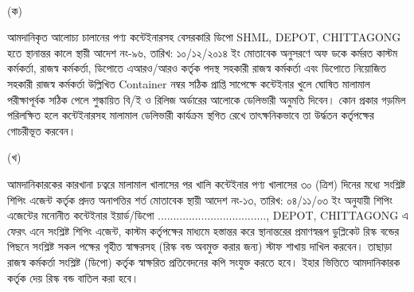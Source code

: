 \documentclass[12pt]{article}
\newcommand{\depo}{SHML, DEPOT, CHITTAGONG}
\newcommand{\rdepo}{..................................., DEPOT, CHITTAGONG}
\begin{document}
\\
\begin{minipage}[t]{0.04\linewidth}
\hspace{0.5em}
\end{minipage}
\begin{minipage}[t]{0.04\linewidth}
\scriptsize{(ক)}
\end{minipage}
\begin{minipage}[t]{.92\linewidth}
\scriptsize{আমদানিকৃত আলোচ্য চালানের পণ্য
কন্টেইনারসহ বেসরকারি ডিপো
{\depo}
হতে স্থানান্তর কালে স্থায়ী
আদেশ নং-৯৬, তারিখ: ১০/১২/২০১৪ ইং
মোতাবেক অনুসরণে অফ ডকে
কর্মরত কাস্টম কর্মকর্তা, রাজস্ব কর্মকর্তা,
ডিপোতে এআরও/আরও কর্তৃক পদস্থ সহকারী রাজস্ব
কর্মকর্তা এবং ডিপোতে নিয়োজিত সহকারী
রাজস্ব কর্মকর্তা উল্লিখিত Container
নম্বর সঠিক প্রাপ্তি সাপেক্ষে কন্টেইনার খুলে
ঘোষিত মালামাল পরীক্ষাপূর্বক সঠিক পেলে শুল্কায়িত
বি/ই ও রিলিজ অর্ডারের আলোকে ডেলিভারী অনুমতি
দিবেন। কোন প্রকার গড়মিল পরিলক্ষিত হলে
কন্টেইনারসহ মালামাল ডেলিভারী কার্যক্রম স্থগিত রেখে
তাৎক্ষনিকভাবে তা উর্দ্ধতন কর্তৃপক্ষের গোচরীভূত করবেন।}
\\
\end{minipage}
\begin{minipage}[t]{0.04\linewidth}
\hspace{0.5em}
\end{minipage}
\begin{minipage}[t]{0.04\linewidth}
\scriptsize{(খ)}
\end{minipage}
\begin{minipage}[t]{0.92\linewidth}
\scriptsize{আমদানিকারকের কারখানা চত্বরে
মালামাল খালাসের পর খালি কন্টেইনার পণ্য খালাসের
৩০ (ত্রিশ) দিনের মধ্যে সংশ্লিষ্ট শিপিং এজেন্ট কর্তৃক
প্রদত্ত অনাপত্তির শর্ত মোতাবেক স্থায়ী
আদেশ নং-১৩, তারিখ: ০৪/১১/০৩ ইং
অনুযায়ী শিপিং এজেন্টের মনোনীত কন্টেইনার
ইয়ার্ড/ডিপো {\rdepo} এ ফেরৎ এনে সংশ্লিষ্ট
শিপিং এজেন্ট, কাস্টম কর্তৃপক্ষের মাধ্যমে হস্তান্তর করে
স্থানান্তরের প্রমাণস্বরূপ ডুপ্লিকেট রিস্ক বন্ডের পিছনে
সংশ্লিষ্ট সকল পক্ষের গৃহীত স্বাক্ষরসহ
(রিস্ক বন্ড অবমুক্ত করার জন্য)
স্টাফ শাখায় দাখিল করবেন।
তাছাড়া রাজস্ব কর্মকর্তা সংশ্লিষ্ট (ডিপো) কর্তৃক
স্বাক্ষরিত প্রতিবেদনের কপি সংযুক্ত করতে হবে।
ইহার ভিত্তিতে আমদানিকারক কর্তৃক দেয়
রিস্ক বন্ড বাতিল করা হবে।}
\\
\\
\\
\\
\\
\\
\end{minipage}
\begin{minipage}[t]{0.72\linewidth}
\hspace{1em}
\end{minipage}
\end{document}
